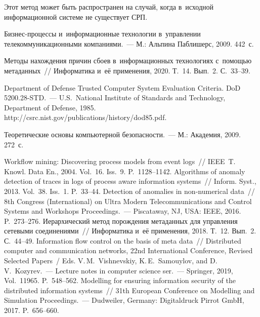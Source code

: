 \begin{multicols}{2}
  Этот метод может быть распространен на случай, когда в~исходной 
  информационной системе не  существует СРП. 
  
{\small\frenchspacing
 {%
 \begin{thebibliography}{99}

 Биз\-нес-про\-цес\-сы и~информационные 
технологии в~управлении телекоммуникационными компаниями.~--- М.: Альпина Паблишерс, 
2009. 442~с.

 Методы нахождения 
причин сбоев в~информационных технологиях с~помощью метаданных~// Информатика и~её 
применения, 2020. Т.~14. Вып.~2. С.~33--39.
 

Department of Defense Trusted Computer System Evaluation Criteria.
DoD 5200.28-STD.~--- U.S.\ National Institute of 
Standards and Technology, Department of Defense, 1985. {\sf 
http://csrc.nist.gov/\linebreak publications/history/dod85.pdf}.

 Теоретические основы компьютерной 
безопасности.~--- М.: Академия, 2009. 272~с.

 Workflow mining: Discovering process models from event 
logs~// IEEE~T. Knowl. Data En., 2004. Vol.~16. Iss.~9. P.~1128--1142. 
 Algorithms of anomaly detection of traces in logs of process aware 
information systems~// Inform. Syst., 2013. Vol.~38. Iss.~1. P.~33--44. 
 Detection of anomalies in non-numerical data~// 8th 
Congress (International) on Ultra Modern Telecommunications and Control Systems and Workshops 
Proceedings.~--- Piscataway, NJ, USA: IEEE, 2016. P.~273--276.
 Иерархический метод порождения 
метаданных для управления сетевыми соединениями~// Информатика и~её применения, 2018. 
Т.~12. Вып.~2. С.~44--49.
 Information flow control on the basis of meta data~//  
Distributed computer and communication networks, 22nd International Conference, Revised Selected 
Papers~/ Eds. V.\,M.~Vishnevskiy, K.\,E.~Samouylov, and D.\,V.~Kozyrev.~---
Lecture notes in computer science ser.~--- Springer, 2019,  Vol.~11965. P.~548--562.
 Modelling for ensuring information security of 
the distributed information systems~// 31th European Conference on Modelling and Simulation 
Proceedings.~--- Dudweiler, Germany: Digitaldruck Pirrot GmbH, 2017. P.~656--660.



\end{thebibliography}}}
\end{multicols}
